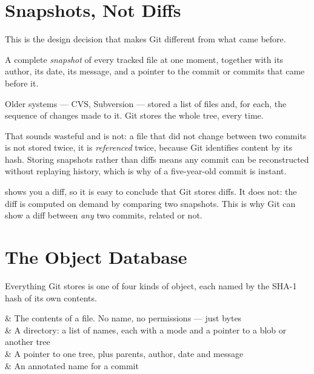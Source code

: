 \section{Snapshots, Not Diffs}\label{sec:git-snapshots}

This is the design decision that makes Git different from what came before.

\begin{definition}[Commit]
	A complete \emph{snapshot} of every tracked file at one moment, together with
	its author, its date, its message, and a pointer to the commit or commits that
	came before it.
\end{definition}

Older systems --- CVS, Subversion --- stored a list of files and, for each, the
sequence of changes made to it. Git stores the whole tree, every time.

\begin{intuition}
	That sounds wasteful and is not: a file that did not change between two commits
	is not stored twice, it is \emph{referenced} twice, because Git identifies
	content by its hash. Storing snapshots rather than diffs means any commit can
	be reconstructed without replaying history, which is why  of
	a five-year-old commit is instant.
\end{intuition}

\begin{note}
	 shows you a diff, so it is easy to conclude that Git stores
	diffs. It does not: the diff is computed on demand by comparing two snapshots.
	This is why Git can show a diff between \emph{any} two commits, related or not.
\end{note}

\section{The Object Database}\label{sec:git-objects}

Everything Git stores is one of four kinds of object, each named by the SHA-1
hash of its own contents.

\begin{keys}[0.20]
	   & The contents of a file. No name, no permissions --- just bytes \\
	   & A directory: a list of names, each with a mode and a pointer to a blob or another tree \\
	 & A pointer to one tree, plus parents, author, date and message  \\
	    & An annotated name for a commit                                 \\
\end{keys}

